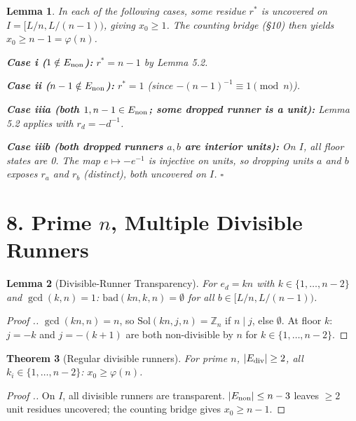 \documentclass[11pt,a4paper]{article}
\theoremstyle{plain}
\newtheorem{theorem}{Theorem}[section]
\newtheorem{lemma}[theorem]{Lemma}
\theoremstyle{definition}
\theoremstyle{remark}
\begin{document}
\begin{lemma}
In each of the following cases, some residue $r^*$ is uncovered on $I = [L/n, L/(n-1))$, giving $x_0 \geq 1$. The counting bridge (§10) then yields $x_0 \geq n-1 = \varphi(n)$.

\textbf{Case i ($1 \notin E_{\rm non}$):} $r^* = n-1$ by Lemma 5.2.

\textbf{Case ii ($n-1 \notin E_{\rm non}$):} $r^* = 1$ (since $-(n-1)^{-1} \equiv 1 \pmod n$).

\textbf{Case iiia (both $1,n-1 \in E_{\rm non}$; some dropped runner is a unit):} Lemma 5.2 applies with $r_d = -d^{-1}$.

\textbf{Case iiib (both dropped runners $a,b$ are interior units):} On $I$, all floor states are 0. The map $e \mapsto -e^{-1}$ is injective on units, so dropping units $a$ and $b$ exposes $r_a$ and $r_b$ (distinct), both uncovered on $I$. $\square$

\end{lemma}


\medskip



\section{8. Prime $n$, Multiple Divisible Runners}



\begin{lemma}[Divisible-Runner Transparency]
For $e_d = kn$ with $k \in \{1,\ldots,n-2\}$ and $\gcd(k,n)=1$: $\mathrm{bad}(kn,k,n) = \emptyset$ for all $b \in [L/n, L/(n-1))$.

\end{lemma}

\begin{proof}[Proof .]
$\gcd(kn,n) = n$, so $\mathrm{Sol}(kn,j,n) = \mathbb{Z}_n$ if $n \mid j$, else $\emptyset$. At floor $k$: $j = -k$ and $j = -(k+1)$ are both non-divisible by $n$ for $k \in \{1,\ldots,n-2\}$.
\end{proof}


\begin{theorem}[Regular divisible runners]
For prime $n$, $|E_{\rm div}| \geq 2$, all $k_i \in \{1,\ldots,n-2\}$: $x_0 \geq \varphi(n)$.

\end{theorem}

\begin{proof}[Proof .]
On $I$, all divisible runners are transparent. $|E_{\rm non}| \leq n-3$ leaves $\geq 2$ unit residues uncovered; the counting bridge gives $x_0 \geq n-1$.
\end{proof}
\end{document}
